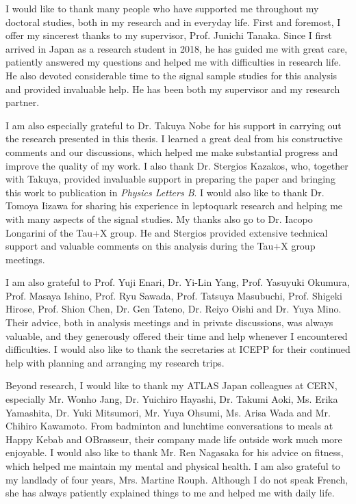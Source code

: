 
\begin{acknowledgements}      

    I would like to thank many people who have supported me throughout my doctoral studies, both in my research and in everyday life. First and foremost, I offer my sincerest thanks to my supervisor, Prof. Junichi Tanaka. Since I first arrived in Japan as a research student in 2018, he has guided me with great care, patiently answered my questions and helped me with difficulties in research life. He also devoted considerable time to the signal sample studies for this analysis and provided invaluable help. He has been both my supervisor and my research partner.

    I am also especially grateful to Dr. Takuya Nobe for his support in carrying out the research presented in this thesis. I learned a great deal from his constructive comments and our discussions, which helped me make substantial progress and improve the quality of my work. I also thank Dr. Stergios Kazakos, who, together with Takuya, provided invaluable support in preparing the paper and bringing this work to publication in \textit{Physics Letters B}. I would also like to thank Dr. Tomoya Iizawa for sharing his experience in leptoquark research and helping me with many aspects of the signal studies. My thanks also go to Dr. Iacopo Longarini of the Tau+X group. He and Stergios provided extensive technical support and valuable comments on this analysis during the Tau+X group meetings.
    
    I am also grateful to Prof. Yuji Enari, Dr. Yi-Lin Yang, Prof. Yasuyuki Okumura, Prof. Masaya Ishino, Prof. Ryu Sawada, Prof. Tatsuya Masubuchi, Prof. Shigeki Hirose, Prof. Shion Chen, Dr. Gen Tateno, Dr. Reiyo Oishi and Dr. Yuya Mino. Their advice, both in analysis meetings and in private discussions, was always valuable, and they generously offered their time and help whenever I encountered difficulties. I would also like to thank the secretaries at ICEPP for their continued help with planning and arranging my research trips.
    
    Beyond research, I would like to thank my ATLAS Japan colleagues at CERN, especially Mr. Wonho Jang, Dr. Yuichiro Hayashi, Dr. Takumi Aoki, Ms. Erika Yamashita, Dr. Yuki Mitsumori, Mr. Yuya Ohsumi, Ms. Arisa Wada and Mr. Chihiro Kawamoto. From badminton and lunchtime conversations to meals at Happy Kebab and OBrasseur, their company made life outside work much more enjoyable. I would also like to thank Mr. Ren Nagasaka for his advice on fitness, which helped me maintain my mental and physical health. I am also grateful to my landlady of four years, Mrs. Martine Rouph. Although I do not speak French, she has always patiently explained things to me and helped me with daily life.
    

\end{acknowledgements}

